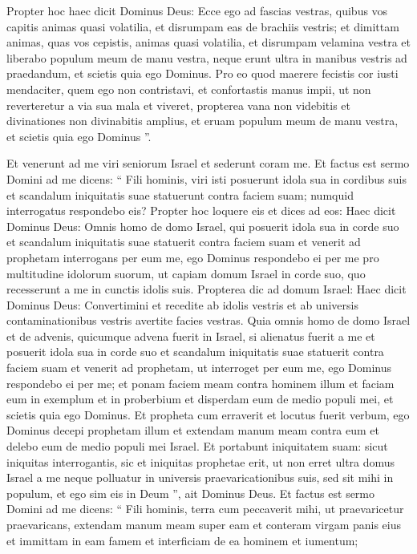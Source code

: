 \begin{biblechapter}
\begin{biblechapter}
\begin{biblechapter}
\begin{biblechapter}
\begin{biblechapter}
\begin{biblechapter}
\begin{biblechapter}
\begin{biblechapter}
\begin{biblechapter}
\begin{biblechapter}
\begin{biblechapter}
\begin{biblechapter}
\begin{biblechapter}
 \verse Propter hoc haec dicit Dominus Deus: Ecce ego ad fascias vestras, quibus vos capitis animas quasi volatilia, et disrumpam eas de brachiis vestris; et dimittam animas, quas vos cepistis, animas quasi volatilia, 
\verse et disrumpam velamina vestra et liberabo populum meum de manu vestra, neque erunt ultra in manibus vestris ad praedandum, et scietis quia ego Dominus.
 \verse Pro eo quod maerere fecistis cor iusti mendaciter, quem ego non contristavi, et confortastis manus impii, ut non reverteretur a via sua mala et viveret, 
 \verse propterea vana non videbitis et divinationes non divinabitis amplius, et eruam populum meum de manu vestra, et scietis quia ego Dominus ”.
 
\begin{biblechapter}
\verse Et venerunt ad me viri seniorum Israel et sederunt coram me. 
\verse Et factus est sermo Domini ad me dicens: 
\verse “ Fili hominis, viri isti posuerunt idola sua in cordibus suis et scandalum iniquitatis suae statuerunt contra faciem suam; numquid interrogatus respondebo eis? 
\verse Propter hoc loquere eis et dices ad eos: Haec dicit Dominus Deus: Omnis homo de domo Israel, qui posuerit idola sua in corde suo et scandalum iniquitatis suae statuerit contra faciem suam et venerit ad prophetam interrogans per eum me, ego Dominus respondebo ei per me pro multitudine idolorum suorum, 
\verse ut capiam domum Israel in corde suo, quo recesserunt a me in cunctis idolis suis.
 \verse Propterea dic ad domum Israel: Haec dicit Dominus Deus: Convertimini et recedite ab idolis vestris et ab universis contaminationibus vestris avertite facies vestras. 
\verse Quia omnis homo de domo Israel et de advenis, quicumque advena fuerit in Israel, si alienatus fuerit a me et posuerit idola sua in corde suo et scandalum iniquitatis suae statuerit contra faciem suam et venerit ad prophetam, ut interroget per eum me, ego Dominus respondebo ei per me; 
\verse et ponam faciem meam contra hominem illum et faciam eum in exemplum et in proberbium et disperdam eum de medio populi mei, et scietis quia ego Dominus. 
 \verse Et propheta cum erraverit et locutus fuerit verbum, ego Dominus decepi prophetam illum et extendam manum meam contra eum et delebo eum de medio populi mei Israel. 
\verse Et portabunt iniquitatem suam: sicut iniquitas interrogantis, sic et iniquitas prophetae erit, 
\verse ut non erret ultra domus Israel a me neque polluatur in universis praevaricationibus suis, sed sit mihi in populum, et ego sim eis in Deum ”, ait Dominus Deus.
 \verse Et factus est sermo Domini ad me dicens: 
\verse “ Fili hominis, terra cum peccaverit mihi, ut praevaricetur praevaricans, extendam manum meam super eam et conteram virgam panis eius et immittam in eam famem et interficiam de ea hominem et iumentum; 

\end{biblechapter}
\end{biblechapter}
\end{biblechapter}
\end{biblechapter}
\end{biblechapter}
\end{biblechapter}
\end{biblechapter}
\end{biblechapter}
\end{biblechapter}
\end{biblechapter}
\end{biblechapter}
\end{biblechapter}
\end{biblechapter}
\end{biblechapter}
